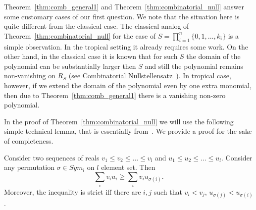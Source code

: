 \documentclass[11pt]{article}
\begin{document}
Theorem~\ref{thm:comb_general1} and Theorem~\ref{thm:combinatorial_null} answer some customary cases of our first question. We note that the situation here is quite different from the classical case. The classical analog of Theorem~\ref{thm:combinatorial_null} for the case of $S =  \prod_{i=1}^n\{0, 1,\ldots, k_i\}$ is a simple observation. In the tropical setting it already requires some work. On the other hand, in the classical case it is known that for such $S$ the domain of the polynomial can be substantially larger then $S$ and still the polynomial remains non-vanishing on $R_S$ (see Combinatorial Nullstellensatz~\cite{Alon99}). In tropical case, however, if we extend the domain of the polynomial even by one extra monomial, then due to Theorem~\ref{thm:comb_general1} there is a vanishing non-zero polynomial.

In the proof of Theorem~\ref{thm:combinatorial_null} we will use the following simple technical lemma, that is essentially from~\cite[p.~261]{hardy1988inequalities}. We provide a proof for the sake of completeness.

\begin{lemma} \label{lem:perm_technical}
Consider two sequences of reals $v_1\leq v_2 \leq \ldots \leq v_l$ and $u_1\leq u_2 \leq \ldots \leq u_l$. Consider any permutation $\sigma \in Sym_l$ on $l$ element set. Then
$$
\sum_i v_i u_i \geq \sum_i v_i u_{\sigma(i)}.
$$
Moreover, the inequality is strict iff there are $i,j$ such that $v_i < v_j$, $u_{\sigma(j)} < u_{\sigma(i)}$.

\end{lemma}

\end{document}
